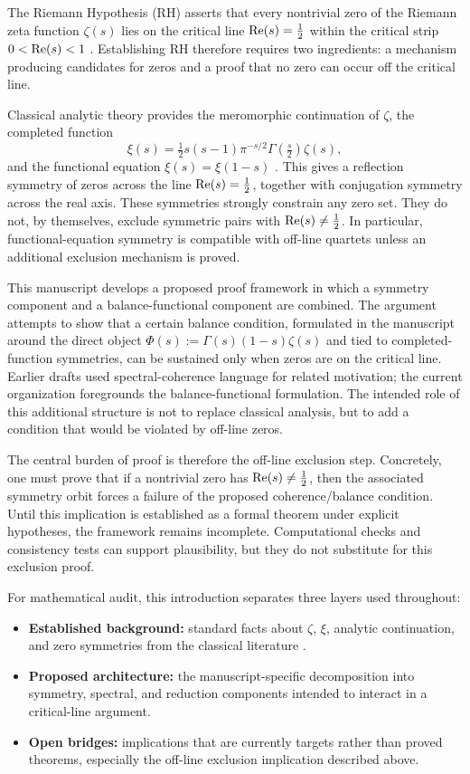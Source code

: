 The Riemann Hypothesis (RH) asserts that every nontrivial zero of the Riemann zeta function $\zeta(s)$ lies on the critical line $\operatorname{Re}(s)=\tfrac12$ within the critical strip $0<\operatorname{Re}(s)<1$ \cite{Riemann1859,Titchmarsh1986,Edwards1974}. Establishing RH therefore requires two ingredients: a mechanism producing candidates for zeros and a proof that no zero can occur off the critical line.

Classical analytic theory provides the meromorphic continuation of $\zeta$, the completed function
\[
\xi(s)=\tfrac12 s(s-1)\pi^{-s/2}\Gamma\!\left(\tfrac{s}{2}\right)\zeta(s),
\]
and the functional equation $\xi(s)=\xi(1-s)$ \cite{Titchmarsh1986,Edwards1974}. This gives a reflection symmetry of zeros across the line $\operatorname{Re}(s)=\tfrac12$, together with conjugation symmetry across the real axis. These symmetries strongly constrain any zero set. They do not, by themselves, exclude symmetric pairs with $\operatorname{Re}(s)\neq \tfrac12$. In particular, functional-equation symmetry is compatible with off-line quartets unless an additional exclusion mechanism is proved.

This manuscript develops a proposed proof framework in which a symmetry component and a balance-functional component are combined. The argument attempts to show that a certain balance condition, formulated in the manuscript around the direct object $\Phi(s):=\Gamma(s)(1-s)\zeta(s)$ and tied to completed-function symmetries, can be sustained only when zeros are on the critical line. Earlier drafts used spectral-coherence language for related motivation; the current organization foregrounds the balance-functional formulation. The intended role of this additional structure is not to replace classical analysis, but to add a condition that would be violated by off-line zeros.

The central burden of proof is therefore the off-line exclusion step. Concretely, one must prove that if a nontrivial zero has $\operatorname{Re}(s)\neq \tfrac12$, then the associated symmetry orbit forces a failure of the proposed coherence/balance condition. Until this implication is established as a formal theorem under explicit hypotheses, the framework remains incomplete. Computational checks and consistency tests can support plausibility, but they do not substitute for this exclusion proof.

For mathematical audit, this introduction separates three layers used throughout:
\begin{itemize}
  \item \textbf{Established background:} standard facts about $\zeta$, $\xi$, analytic continuation, and zero symmetries from the classical literature \cite{Titchmarsh1986,Edwards1974}.
  \item \textbf{Proposed architecture:} the manuscript-specific decomposition into symmetry, spectral, and reduction components intended to interact in a critical-line argument.
  \item \textbf{Open bridges:} implications that are currently targets rather than proved theorems, especially the off-line exclusion implication described above.
\end{itemize}

